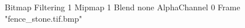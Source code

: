 {Bitmap
	{Filtering 1}
	{Mipmap 1}
	{Blend none}
	{AlphaChannel 0}
	{Frame "fence_stone.tif.bmp"}
}
